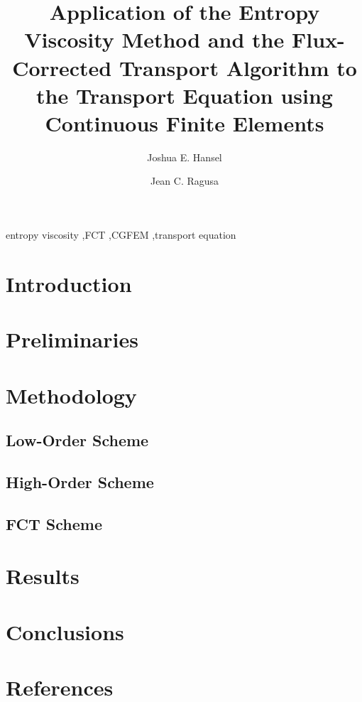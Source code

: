 \documentclass{elsarticle}
\begin{document}
\begin{frontmatter}


\title{Application of the Entropy Viscosity Method and the Flux-Corrected Transport
  Algorithm to the Transport Equation using Continuous Finite Elements}

\author[tamu]{Joshua E. Hansel}

\author[tamu]{Jean C. Ragusa}

\address[tamu]{Texas A\&M University,
  400 Bizzell St,
  College Station, TX 77840}



\begin{keyword}
entropy viscosity \sep FCT \sep CGFEM \sep transport equation
\end{keyword}

\end{frontmatter}

\section{Introduction\label{sec:introduction}}


\section{Preliminaries\label{sec:preliminaries}}


\section{Methodology\label{sec:methodology}}

\subsection{Low-Order Scheme\label{sec:low}}

\subsection{High-Order Scheme\label{sec:high}}

\subsection{FCT Scheme\label{sec:fct}}


\section{Results\label{sec:results}}


\section{Conclusions\label{sec:conclusions}}


\section*{References}


\end{document}
